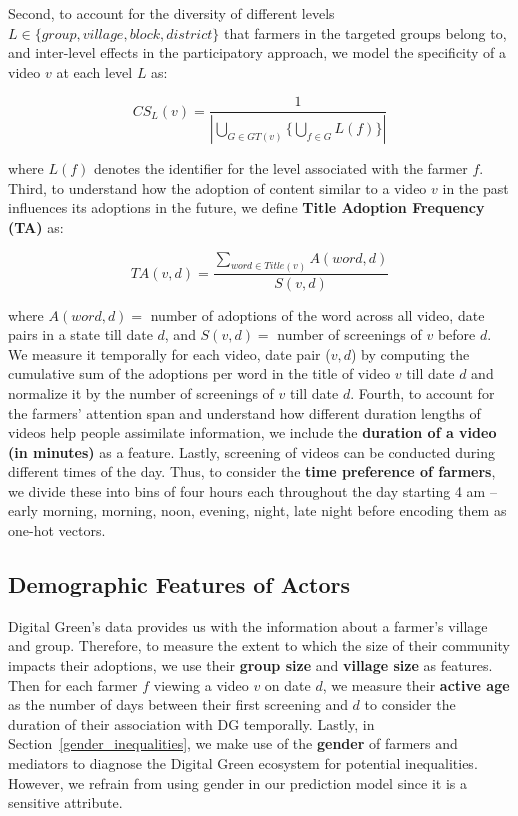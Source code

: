 \documentclass[manuscript,screen]{acmart}
\begin{document}
Second, to account for the diversity of different levels $L \in \{group,village,block,district\}$ that farmers in the targeted groups belong to, and inter-level effects in the participatory approach, we model the specificity of a video $v$ at each level $L$ as:

\begin{equation}
    CS_{L}(v) = \frac{1}{|\bigcup_{G \in GT(v)}{}{\{\bigcup_{f \in G}L(f)\}}|}
\end{equation}

where $L(f)$ denotes the identifier for the level associated with the farmer $f$. Third, to understand how the adoption of content similar to a video $v$ in the past influences its adoptions in the future, we define \textbf{Title Adoption Frequency (TA)} as: 

\begin{equation}
    TA(v, d) = \frac{\sum_{word \in Title(v)}{A(word, d)}}{S(v, d)}
\end{equation}

where $A(word, d) = $ number of adoptions of the word across all video, date pairs in a state till date $d$, and $S(v, d) = $ number of screenings of $v$ before $d$. We measure it temporally for each video, date pair ($v,d$) by computing the cumulative sum of the adoptions per word in the title of video $v$ till date $d$ and normalize it by the number of screenings of $v$ till date $d$. Fourth, to account for the farmers' attention span and understand how different duration lengths of videos help people assimilate information, we include the \textbf{duration of a video (in minutes)} as a feature. Lastly, screening of videos can be conducted during different times of the day. Thus, to consider the \textbf{time preference of farmers}, we divide these into bins of four hours each throughout the day starting 4 am -- early morning, morning, noon, evening, night, late night before encoding them as one-hot vectors.

\subsection{Demographic Features of Actors} \label{demographic_features}

Digital Green's data provides us with the information about a farmer's village and group. Therefore, to measure the extent to which the size of their community impacts their adoptions, we use their \textbf{group size} and \textbf{village size} as features. Then for each farmer $f$ viewing a video $v$ on date $d$, we measure their \textbf{active age} as the number of days between their first screening and $d$ to consider the duration of their association with DG temporally. Lastly, in Section~\ref{gender_inequalities}, we make use of the \textbf{gender} of farmers and mediators to diagnose the Digital Green ecosystem for potential inequalities. However, we refrain from using gender in our prediction model since it is a sensitive attribute.
\end{document}
